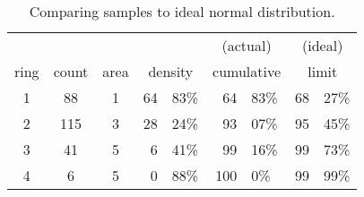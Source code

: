  \begin{table}[htbp]  %
    \caption{Comparing samples to ideal normal distribution.}
    \begin{center}
      \begin{tabular}{cccr@{.}lr@{.}lr@{.}l}
        &&&&& \multicolumn{2}{c}{(actual)} & \multicolumn{2}{c}{(ideal)} \\
        ring & count & area &  \multicolumn{2}{c}{density} & \multicolumn{2}{c}{cumulative} & \multicolumn{2}{c}{limit} \\\hline
        1 &  88 & 1 & 64 & 83\% & 64 & 83\% & 68 & 27\% \\
        2 & 115 & 3 & 28 & 24\% & 93 & 07\% & 95 & 45\% \\
        3 &  41 & 5 & 6 & 41\% & 99 & 16\% & 99 & 73\%\\
        4 &   6 & 5 & 0 & 88\% & 100 & 0\% & 99 & 99\%\\
      \end{tabular}
    \end{center}
  \end{table}%

\endinput